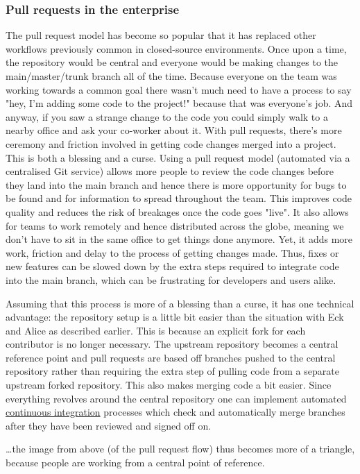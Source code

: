\begin{frame}
    \frametitle{Pull requests in the enterprise}

The pull request model has become so popular that it has replaced other
workflows previously common in closed-source environments.  Once upon a
time, the repository would be central and everyone would be making changes
to the main/master/trunk branch all of the time.  Because everyone on
the team was working towards a common goal there wasn't much need to have a
process to say "hey, I'm adding some code to the project!" because that was
everyone's job.  And anyway, if you saw a strange change to the code you
could simply walk to a nearby office and ask your co-worker about it.  With
pull requests, there's more ceremony and friction involved in getting code
changes merged into a project.  This is both a blessing and a curse.  Using
a pull request model (automated via a centralised Git service) allows more
people to review the code changes before they land into the main branch and
hence there is more opportunity for bugs to be found and for information to
spread throughout the team.  This improves code quality and reduces the risk
of breakages once the code goes "live".  It also allows for teams to work
remotely and hence distributed across the globe, meaning we don't have to
sit in the same office to get things done anymore.  Yet, it adds more work,
friction and delay to the process of getting changes made.  Thus, fixes or
new features can be slowed down by the extra steps required to integrate
code into the main branch, which can be frustrating for developers and users
alike.

Assuming that this process is more of a blessing than a curse, it has one
technical advantage: the repository setup is a little bit easier than the
situation with Eck and Alice as described earlier.  This is because an
explicit fork for each contributor is no longer necessary.  The upstream
repository becomes a central reference point and pull requests are based off
branches pushed to the central repository rather than requiring the extra
step of pulling code from a separate upstream forked repository.  This also
makes merging code a bit easier.  Since everything revolves around the
central repository one can implement automated
\href{https://en.wikipedia.org/wiki/Continuous_integration}{continuous
integration} processes
which check and automatically merge branches after they have been reviewed
and signed off on.

\ldots the image from above (of the pull request flow) thus becomes more of a
triangle, because people are working from a central point of reference.
\end{frame}
